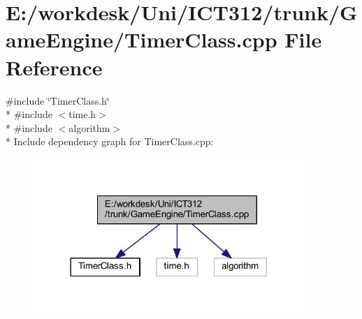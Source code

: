\section{E\+:/workdesk/\+Uni/\+I\+C\+T312/trunk/\+Game\+Engine/\+Timer\+Class.cpp File Reference}
\label{_timer_class_8cpp}
{\ttfamily \#include \char`\"{}Timer\+Class.\+h\char`\"{}}\\*
{\ttfamily \#include $<$time.\+h$>$}\\*
{\ttfamily \#include $<$algorithm$>$}\\*
Include dependency graph for Timer\+Class.\+cpp\+:\nopagebreak
\begin{figure}[H]
\begin{center}
\leavevmode
\includegraphics[width=290pt]{d7/d6f/_timer_class_8cpp__incl}
\end{center}
\end{figure}
